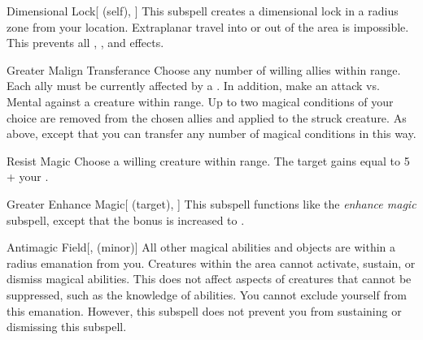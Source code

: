 \begin{ability}[\nth{4}]{Dimensional Lock}[ (self), ]
This subspell creates a dimensional lock in a \arealarge radius zone from your location.
Extraplanar travel into or out of the area is impossible.
This prevents all , , and  effects.
\end{ability}
\vspace{0.25em}


\begin{ability}[\nth{5}]{Greater Malign Transferance}
Choose any number of willing allies within \rngmed range.
Each ally must be currently affected by a  .
In addition, make an attack vs. Mental against a creature within \rngmed range.
\hit Up to two magical conditions of your choice are removed from the chosen allies and applied to the struck creature.
\crit As above, except that you can transfer any number of magical conditions in this way.
\end{ability}
\vspace{0.25em}


\begin{ability}[\nth{5}]{Resist Magic}
Choose a willing creature within \rngmed range.
The target gains  equal to 5 + your .
\end{ability}
\vspace{0.25em}


\begin{ability}[\nth{6}]{Greater Enhance Magic}[ (target), ]
This subspell functions like the \textit{enhance magic} subspell, except that the bonus is increased to .
\end{ability}
\vspace{0.25em}


\begin{ability}[\nth{7}]{Antimagic Field}[,  (minor)]
All other magical abilities and objects are  within a \areamed radius emanation from you.
Creatures within the area cannot activate, sustain, or dismiss magical abilities.
This does not affect aspects of creatures that cannot be suppressed, such as the knowledge of abilities.
You cannot exclude yourself from this emanation.
However, this subspell does not prevent you from sustaining or dismissing this subspell.
\end{ability}
\vspace{0.25em}

